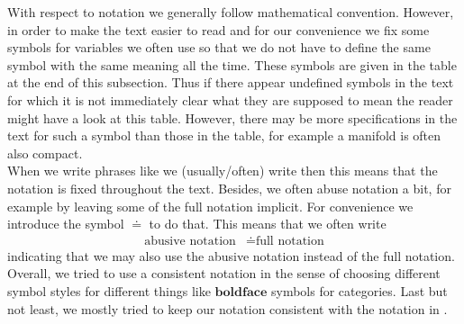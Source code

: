 With respect to notation we generally follow mathematical convention. However, in order to make the text easier to read and for our convenience we fix some symbols for variables we often use so that we do not have to define the same symbol with the same meaning all the time. These symbols are given in the table at the end of this subsection. Thus if there appear undefined symbols in the text for which it is not immediately clear what they are supposed to mean the reader might have a look at this table. However, there may be more specifications in the text for such a symbol than those in the table, for example a manifold is often also compact.
\\
When we write phrases like {\glqq}we (usually/often) write{\grqq} then this means that the notation is fixed throughout the text. Besides, we often abuse notation a bit, for example by leaving some of the full notation implicit. For convenience we introduce the symbol $\doteq$ to do that. This means that we often write
\begin{align*}
  \text{abusive notation}
  &\doteq
  \text{full notation}
\end{align*}
indicating that we may also use the abusive notation instead of the full notation. Overall, we tried to use a consistent notation in the sense of choosing different symbol styles for different things like $\mathbf{boldface}$ symbols for categories. Last but not least, we mostly tried to keep our notation consistent with the notation in \cite{00000001}.
